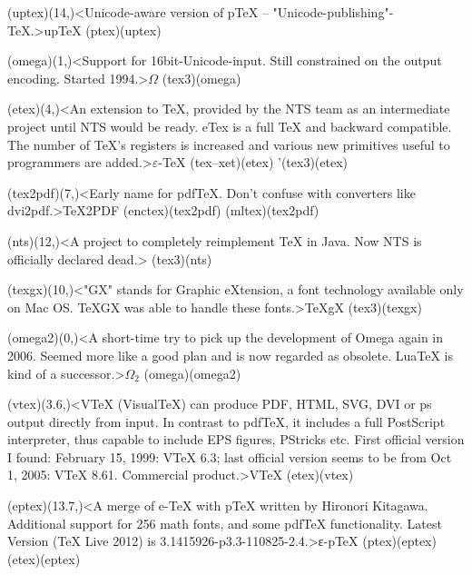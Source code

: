 {	\tonode[\experimental](uptex)(14,\layer)<Unicode-aware version of pTeX – "Unicode-publishing"-TeX.>{up\TeX}
		\todraw(ptex)(uptex)
	\steplayer[-2]

	\tonode[\experimental](omega)(1,\layer)<Support for 16bit-Unicode-input. Still constrained on the output encoding. Started 1994.>{$\Omega$}
		\todraw(tex3)(omega)
	
	\tonode[\vip](etex)(4,\layer)<An extension to TeX, provided by the NTS team as an intermediate project until NTS would be ready. eTex is a full TeX and backward compatible. The number of TeX's registers is increased and various new primitives useful to programmers are added.>{$\varepsilon$-\TeX}
		\todraw(tex--xet)(etex)
		\todraw'(tex3)(etex)

	\tonode(tex2pdf)(7,\layer)<Early name for pdfTeX. Don't confuse with converters like dvi2pdf.>{\TeX2PDF}
		\todraw(enctex)(tex2pdf)
		\todraw(mltex)(tex2pdf)
	
	\tonode(nts)(12,\layer)<A project to completely reimplement TeX in Java. Now NTS is officially declared dead.>{\NTS}
		\todraw(tex3)(nts)

	\steplayer[-1]

	\tonode(texgx)(10,\layer)<"GX" stands for Graphic eXtension, a font technology available only on Mac OS. TeXGX was able to handle these fonts.>{\TeX{}gX}
		\todraw(tex3)(texgx)

	\steplayer[-1]

	\tonode[\experimental](omega2)(0,\layer)<A short-time try to pick up the development of Omega again in 2006. Seemed more like a good plan and is now regarded as obsolete. LuaTeX is kind of a successor.>{$\Omega_2$}
		\todraw(omega)(omega2)
	
	\tonode[\experimental](vtex)(3.6,\layer)<VTeX (VisualTeX) can produce PDF, HTML, SVG, DVI or ps output directly from input. In contrast to pdfTeX, it includes a full PostScript interpreter, thus capable to include EPS figures, PStricks etc. First official version I found: February 15, 1999: VTeX 6.3; last official version seems to be from Oct 1, 2005: VTeX 8.61. Commercial product.>{V\TeX}
		\todraw(etex)(vtex)

	\steplayer[-1]

	\tonode(eptex)(13.7,\layer)<A merge of e-TeX with pTeX written by Hironori Kitagawa. Additional support for 256 math fonts, and some pdfTeX functionality. Latest Version (TeX Live 2012) is 3.1415926-p3.3-110825-2.4.>{ε-p\TeX}
		\todraw(ptex)(eptex)
		\todraw(etex)(eptex)

}
